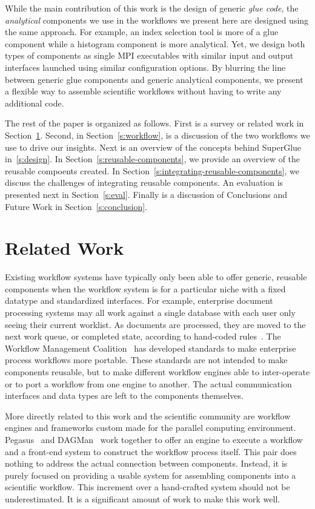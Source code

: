 \documentclass[conference]{IEEEtran}
\begin{document}
While the main contribution of this work is the design of generic \textit{glue
code}, the \textit{analytical} components we use in the workflows we present
here are designed using the same approach. For example, an index selection tool
is more of a glue component while a histogram component is more analytical.
Yet, we design both types of components as single MPI executables with similar
input and output interfaces launched using similar configuration options.  By
blurring the line between generic glue components and generic analytical
components, we present a flexible way to assemble scientific workflows without
having to write any additional code. 

The rest of the paper is organized as follows. First is a survey or related
work in Section~\ref{s:related}. Second, in Section~\ref{s:workflow}, is a
discussion of the two workflows we use to drive our insights. Next is an
overview of the concepts behind SuperGlue in~\ref{s:design}.  In
Section~\ref{s:reusable-components}, we provide an overview of the reusable
compoents created. In Section~\ref{s:integrating-reusable-components}, we
discuss the challenges of integrating reusable components.  An evaluation is
presented next in Section~\ref{s:eval}. Finally is a discussion of Conclusions
and Future Work in Section~\ref{s:conclusion}.

\section{Related Work}
\label{s:related}

Existing workflow systems have typically only been able to offer generic,
reusable components when the workflow system is for a particular niche with a
fixed datatype and standardized interfaces. For example, enterprise document
processing systems may all work against a single database with each user only
seeing their current worklist. As documents are processed, they are moved to
the next work queue, or completed state, according to hand-coded
rules~\cite{mckesson-workflow}. The Workflow Management Coalition~\cite{wfmc}
has developed standards to make enterprise process workflows more portable.
These standards are not intended to make components reusable, but to make
different workflow engines able to inter-operate or to port a workflow from one
engine to another.  The actual communication interfaces and data types are left
to the components themselves.

More directly related to this work and the scientific community are workflow
engines and frameworks custom made for the parallel computing environment.
Pegasus~\cite{mullender:pegasus} and DAGMan~\cite{Malewicz:2006:dagman} work
together to offer an engine to execute a workflow and a front-end system to
construct the workflow process itself. This pair does nothing to address the
actual connection between components. Instead, it is purely focused on
providing a usable system for assembling components into a scientific workflow.
This increment over a hand-crafted system should not be underestimated. It is a
significant amount of work to make this work well.
\end{document}
